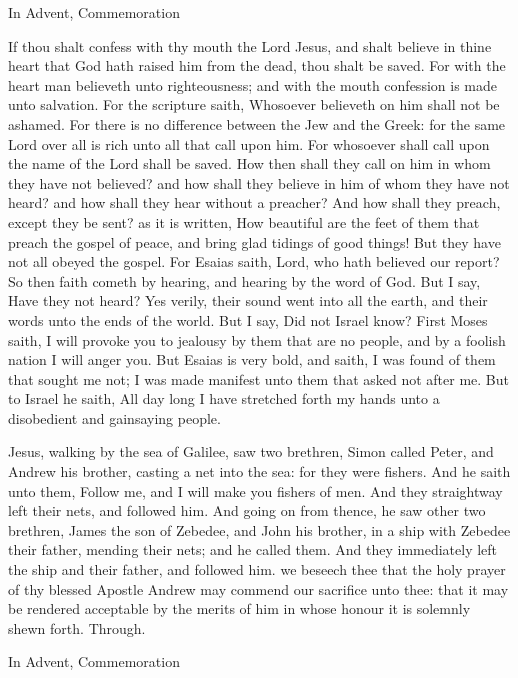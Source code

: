 \begin{rubric}
    In Advent, Commemoration 
\end{rubric}

 If thou shalt confess with thy mouth the Lord Jesus, and shalt believe in thine heart that God hath raised him from the dead, thou shalt be saved. For with the heart man believeth unto righteousness; and with the mouth confession is made unto salvation. For the scripture saith, Whosoever believeth on him shall not be ashamed. For there is no difference between the Jew and the Greek: for the same Lord over all is rich unto all that call upon him. For whosoever shall call upon the name of the Lord shall be saved. How then shall they call on him in whom they have not believed? and how shall they believe in him of whom they have not heard? and how shall they hear without a preacher? And how shall they preach, except they be sent? as it is written, How beautiful are the feet of them that preach the gospel of peace, and bring glad tidings of good things! But they have not all obeyed the gospel. For Esaias saith, Lord, who hath believed our report? So then faith cometh by hearing, and hearing by the word of God. But I say, Have they not heard? Yes verily, their sound went into all the earth, and their words unto the ends of the world. But I say, Did not Israel know? First Moses saith, I will provoke you to jealousy by them that are no people, and by a foolish nation I will anger you. But Esaias is very bold, and saith, I was found of them that sought me not; I was made manifest unto them that asked not after me. But to Israel he saith, All day long I have stretched forth my hands unto a disobedient and gainsaying people.


 Jesus, walking by the sea of Galilee, saw two brethren, Simon called Peter, and Andrew his brother, casting a net into the sea: for they were fishers. And he saith unto them, Follow me, and I will make you fishers of men. And they straightway left their nets, and followed him. And going on from thence, he saw other two brethren, James the son of Zebedee, and John his brother, in a ship with Zebedee their father, mending their nets; and he called them. And they immediately left the ship and their father, and followed him.
\secret
{} we beseech thee that the holy prayer of thy blessed Apostle Andrew may commend our sacrifice unto thee: that it may be rendered acceptable by the merits of him in whose honour it is solemnly shewn forth. Through.
\begin{rubric}
    In Advent, Commemoration 
\end{rubric}

